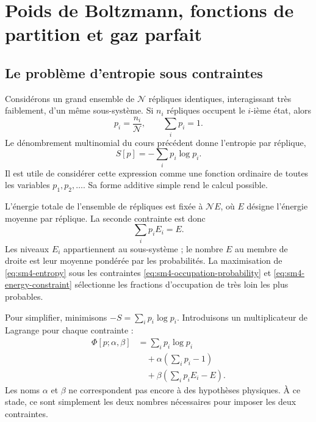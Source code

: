 \chapter{Poids de Boltzmann, fonctions de partition et gaz parfait}


\section{Le problème d’entropie sous contraintes}

Considérons un grand ensemble de \(\mathcal N\) répliques identiques, interagissant très faiblement, d’un même sous-système. Si \(n_i\) répliques occupent le \(i\)-ième état, alors
\begin{equation}
 p_i=\frac{n_i}{\mathcal N},
 \qquad
 \sum_i p_i=1.
 \label{eq:sm4-occupation-probability}
\end{equation}
Le dénombrement multinomial du cours précédent donne l’entropie par réplique,
\begin{equation}
 S[p]=-\sum_i p_i\log p_i.
 \label{eq:sm4-entropy}
\end{equation}
Il est utile de considérer cette expression comme une fonction ordinaire de toutes les variables \(p_1,p_2,\ldots\). Sa forme additive simple rend le calcul possible.

L’énergie totale de l’ensemble de répliques est fixée à \(\mathcal N E\), où \(E\) désigne l’énergie moyenne par réplique. La seconde contrainte est donc
\begin{equation}
 \sum_i p_iE_i=E.
 \label{eq:sm4-energy-constraint}
\end{equation}
Les niveaux \(E_i\) appartiennent au sous-système ; le nombre \(E\) au membre de droite est leur moyenne pondérée par les probabilités. La maximisation de \eqref{eq:sm4-entropy} sous les contraintes \eqref{eq:sm4-occupation-probability} et \eqref{eq:sm4-energy-constraint} sélectionne les fractions d’occupation de très loin les plus probables.

Pour simplifier, minimisons \(-S=\sum_i p_i\log p_i\). Introduisons un multiplicateur de Lagrange pour chaque contrainte :
\begin{equation}
 \begin{aligned}
 \Phi[p;\alpha,\beta]
 &=\sum_i p_i\log p_i\\
 &\quad+\alpha\left(\sum_i p_i-1\right)\\
 &\quad+\beta\left(\sum_i p_iE_i-E\right).
 \end{aligned}
 \label{eq:sm4-augmented-functional}
\end{equation}
Les noms \(\alpha\) et \(\beta\) ne correspondent pas encore à des hypothèses physiques. À ce stade, ce sont simplement les deux nombres nécessaires pour imposer les deux contraintes.

